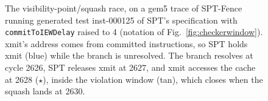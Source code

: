 \begin{figure}[t]
{%
}%
\caption{
The visibility-point/squash race, on a gem5 trace of SPT-Fence running generated test inst-000125 of SPT's specification with \texttt{commitToIEWDelay} raised to 4 (notation of Fig.~\ref{fig:checkerwindow}). xmit's address comes from committed instructions, so SPT holds xmit (blue) while the branch is unresolved. The branch resolves at cycle 2626, SPT releases xmit at 2627, and xmit accesses the cache at 2628 ($\star$), inside the violation window (tan), which closes when the squash lands at 2630.}
\label{fig:racev2}\label{fig:race}
\end{figure}
